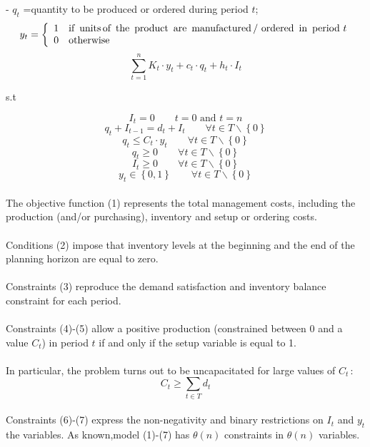 \documentclass[a4paper,12pt,titlepage]{article}
\begin{document}
- $q_t$ =quantity to be produced or ordered during period $t$;\\
$$y_t=
\bigg \{
\begin{array}{ll}
1\quad \text{if \,units\,of\, the\, product\, are\, manufactured\,/ ordered\, in\, period\,}\, t\\
0\quad \text{otherwise}\\
\end{array}
$$
\begin{equation}
	\sum_{t=1}^{n}K_t\cdot y_t+c_t\cdot q_t+h_t\cdot I_t
\end{equation}
\begin{center}
s.t
\end{center}
\begin{equation}
I_t =0\qquad t=0\,\, \text{and}\,\, t=n
\end{equation}
\begin{equation}
q_t+I_{t-1}=d_t+I_t\qquad \forall t \in T\backslash\left\lbrace 0 \right\rbrace 
\end{equation}
\begin{equation}
q_t \leq C_t\cdot y_t \qquad \forall t \in T\backslash\left\lbrace 0 \right\rbrace 
\end{equation}
\begin{equation}
q_t\geq 0 \qquad \forall t \in T\backslash\left\lbrace 0 \right\rbrace 
\end{equation}
\begin{equation}
I_t \geq 0 \qquad \forall t \in T\backslash\left\lbrace 0 \right\rbrace 
\end{equation}
\begin{equation}
y_t \in \left\lbrace 0,1\right\rbrace \qquad \forall t \in T\backslash\left\lbrace 0 \right\rbrace 
\end{equation}
\\
The objective function (1) represents the total management costs, including the production
(and/or purchasing), inventory and setup or ordering costs.\\
\\
Conditions (2) impose that inventory levels at the beginning and the end of the planning horizon are equal to zero. \\
\\
Constraints (3) reproduce the
demand satisfaction and inventory balance constraint for each period. \\
\\
Constraints (4)-(5) allow a positive production (constrained between $0$ and a value $C_t$) in period $t$ if and only if the setup variable is equal to 1. \\
\\
In particular, the problem turns out to be uncapacitated for large values of $C_t$\,:
\begin{equation*}
	C_t \geq \sum_{t\in T}d_t
\end{equation*}
\\
Constraints (6)-(7) express the non-negativity and binary restrictions on $I_t$ and $y_t$ the variables.
 As known,model (1)-(7) has $\theta (n)$ constraints in $\theta (n)$ variables.
\end{document}

